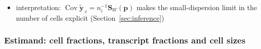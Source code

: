 \begin{itemize}
\begin{itemize}
          \((a,n)=(1,10^{3})\), \((0.05,10^{5})\) and \((1,10^{6})\), singular in double precision; \(3.5\times10^{4}\),
          \(3.5\times10^{6}\) and \(3.5\times10^{7}\) in \((\boldsymbol{\rho},\log a,\log n)\), where the two scales are almost
          collinear; and \(8.8\times10^{3}\), \(8.8\times10^{5}\) and \(8.8\times10^{6}\) in \((\boldsymbol{\rho},\log c,\log\phi)\);
          profiling the scales out removes the remaining growth with \(n\)
    \item interpretation: \(\operatorname{Cov}\tilde{\boldsymbol{y}}_{\cdot i}=n_{i}^{-1}\boldsymbol{S}_{W}(\boldsymbol{p})\) makes the
          small-dispersion limit in the number of cells explicit (Section~\ref{sec:inference})
  \end{itemize}
\end{itemize}

\subsubsection{Estimand: cell fractions, transcript fractions and cell sizes}
\label{sec:estimand}

